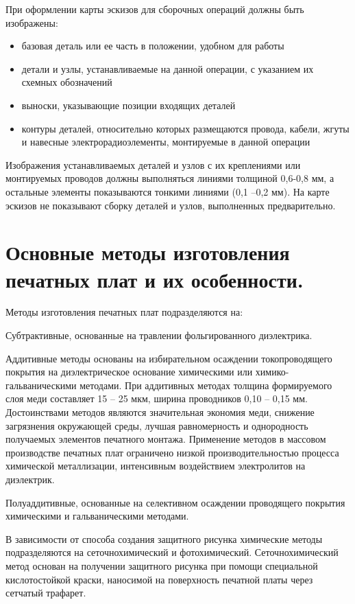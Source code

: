 \documentclass[unicode, 12pt, a4paper, oneside]{article}
\begin{document}
При оформлении карты эскизов для сборочных операций должны быть изображены:

\begin{itemize}
\item базовая деталь или ее часть в положении, удобном для  работы
\item детали и узлы, устанавливаемые на данной операции, с указанием их схемных обозначений
\item выноски, указывающие позиции входящих деталей
\item контуры деталей, относительно которых размещаются провода, кабели, жгуты и навесные электрорадиоэлементы, монтируемые в данной операции
\end{itemize}

Изображения устанавливаемых деталей и узлов с их креплениями или монтируемых проводов должны выполняться линиями толщиной 0,6-0,8 мм, а остальные элементы показываются тонкими линиями (0,1 –0,2 мм). На карте эскизов не показывают сборку деталей и узлов, выполненных предварительно.


\section{Основные методы изготовления печатных плат и их особенности.}

Методы изготовления печатных плат подразделяются на:

Субтрактивные, основанные на травлении фольгированного диэлектрика.

Аддитивные методы основаны на избирательном осаждении токопроводящего покрытия на диэлектрическое основание химическими или химико-гальваническими методами. При аддитивных методах толщина формируемого слоя меди составляет 15 – 25 мкм, ширина проводников  0,10 – 0,15 мм. Достоинствами методов являются  значительная экономия меди, снижение загрязнения окружающей среды, лучшая равномерность и однородность получаемых элементов печатного монтажа. Применение методов в массовом производстве печатных плат ограничено низкой производительностью процесса химической металлизации, интенсивным воздействием электролитов на диэлектрик.

Полуаддитивные, основанные на селективном осаждении проводящего покрытия химическими и гальваническими методами.

В зависимости от способа создания защитного рисунка химические методы подразделяются на сеточнохимический и фотохимический. Сеточнохимический метод основан на получении защитного рисунка при помощи специальной кислотостойкой краски, наносимой на поверхность печатной платы через сетчатый трафарет.
\end{document}
